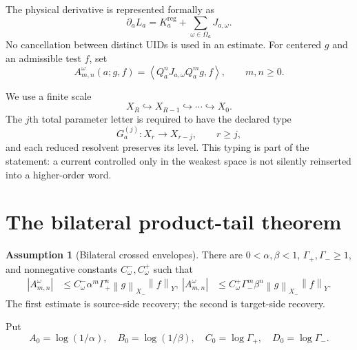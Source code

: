 \documentclass[11pt,reqno]{amsart}
\theoremstyle{definition}
\newtheorem{assumption}[theorem]{Assumption}
\theoremstyle{remark}
\newcommand{\norm}[1]{\left\lVert #1\right\rVert}
\newcommand{\abs}[1]{\left\lvert #1\right\rvert}
\newcommand{\pair}[2]{\left\langle #1,#2\right\rangle}
\begin{document}
The physical derivative is represented formally as
\begin{equation}\label{eq:source}
 \partial_aL_a=K_a^{\mathrm{reg}}+
 \sum_{\omega\in\Omega_a}J_{a,\omega}.
\end{equation}
No cancellation between distinct UIDs is used in an estimate.  For centered
$g$ and an admissible test $f$, set
\begin{equation}\label{eq:atom}
 A_{m,n}^{\omega}(a;g,f)
 =\pair{Q_a^nJ_{a,\omega}Q_a^m g}{f},
 \qquad m,n\ge0.
\end{equation}

We use a finite scale
\begin{equation}\label{eq:scale}
 X_R\hookrightarrow X_{R-1}\hookrightarrow\cdots\hookrightarrow X_0.
\end{equation}
The $j$th total parameter letter is required to have the declared type
\begin{equation}\label{eq:letter}
 G_a^{(j)}:X_r\longrightarrow X_{r-j},\qquad r\ge j,
\end{equation}
and each reduced resolvent preserves its level.  This typing is part of the
statement: a current controlled only in the weakest space is not silently
reinserted into a higher-order word.

\section{The bilateral product-tail theorem}\label{sec:bilateral}

\begin{assumption}[Bilateral crossed envelopes]\label{ass:crossed}
There are $0<\alpha,\beta<1$, $\Gamma_+,\Gamma_-\ge1$, and nonnegative
constants $C_\omega^-,C_\omega^+$ such that
\begin{align}
 \abs{A_{m,n}^{\omega}}
 &\le C_\omega^-\alpha^m\Gamma_+^n
       \norm{g}_{X_-}\norm{f}_{Y},\label{eq:rev}\
 \abs{A_{m,n}^{\omega}}
 &\le C_\omega^+\Gamma_-^m\beta^n
       \norm{g}_{X_-}\norm{f}_{Y}.
       \label{eq:fwd}
\end{align}
The first estimate is source-side recovery; the second is target-side
recovery.
\end{assumption}

Put
\[
 A_0=\log(1/\alpha),\quad B_0=\log(1/\beta),\quad
 C_0=\log\Gamma_+,\quad D_0=\log\Gamma_-.
\]
\end{document}
